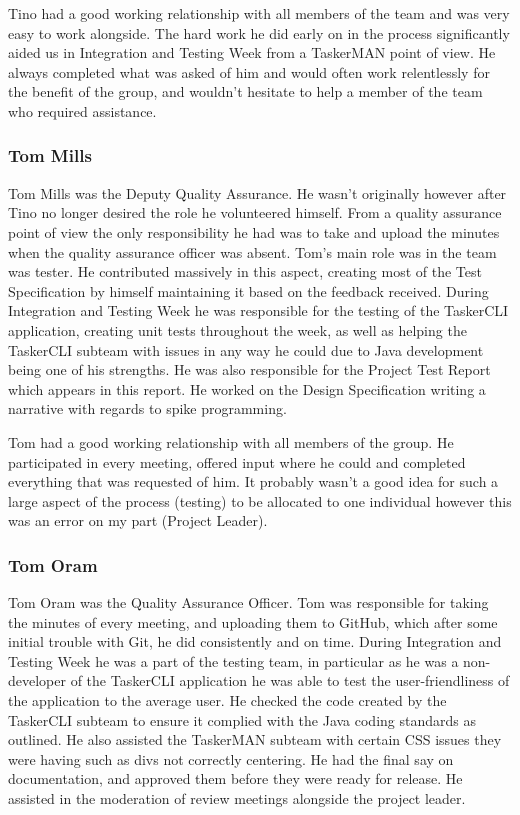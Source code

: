 \documentclass{project}
\begin{document}
Tino had a good working relationship with all members of the team and was very easy to work alongside. The hard work he did early on in the process significantly aided us in Integration and Testing Week from a TaskerMAN point of view. He always completed what was asked of him and would often work relentlessly for the benefit of the group, and wouldn't hesitate to help a member of the team who required assistance.
\subsubsection{Tom Mills}
Tom Mills was the Deputy Quality Assurance. He wasn't originally however after Tino no longer desired the role he volunteered himself. From a quality assurance point of view the only responsibility he had was to take and upload the minutes when the quality assurance officer was absent. Tom's main role was in the team was tester. He contributed massively in this aspect, creating most of the Test Specification by himself maintaining it based on the feedback received. During Integration and Testing Week he was responsible for the testing of the TaskerCLI application, creating unit tests throughout the week, as well as helping the TaskerCLI subteam with issues in any way he could due to Java development being one of his strengths. He was also responsible for the Project Test Report which appears in this report. He worked on the Design Specification\cite{se.qa.ds} writing a narrative with regards to spike programming.

Tom had a good working relationship with all members of the group. He participated in every meeting, offered input where he could and completed everything that was requested of him. It probably wasn't a good idea for such a large aspect of the process (testing) to be allocated to one individual however this was an error on my part (Project Leader).
\subsubsection{Tom Oram}
Tom Oram was the Quality Assurance Officer. Tom was responsible for taking the minutes of every meeting, and uploading them to GitHub, which after some initial trouble with Git, he did consistently and on time. During Integration and Testing Week he was a part of the testing team, in particular as he was a non-developer of the TaskerCLI application he was able to test the user-friendliness of the application to the average user. He checked the code created by the TaskerCLI subteam to ensure it complied with the Java coding standards as outlined\cite{se.qa.jcs}. He also assisted the TaskerMAN subteam with certain CSS issues they were having such as divs not correctly centering. He had the final say on documentation, and approved them before they were ready for release. He assisted in the moderation of review meetings alongside the project leader.
\end{document}
